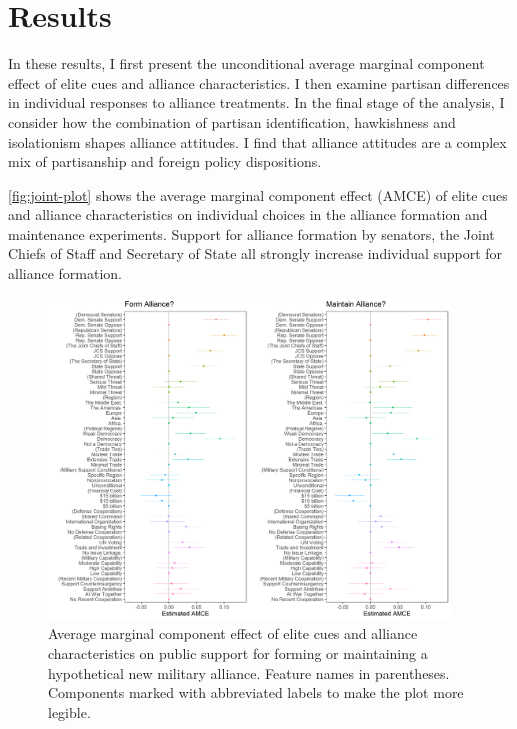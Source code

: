 \documentclass[12pt]{article}
\begin{document}
\section{Results} 


In these results, I first present the unconditional average marginal component effect of elite cues and alliance characteristics.
I then examine partisan differences in individual responses to alliance treatments. 
In the final stage of the analysis, I consider how the combination of partisan identification, hawkishness and isolationism shapes alliance attitudes. 
I find that alliance attitudes are a complex mix of partisanship and foreign policy dispositions. 


\autoref{fig:joint-plot} shows the average marginal component effect (AMCE) of elite cues and alliance characteristics on individual choices in the alliance formation and maintenance experiments.
Support for alliance formation by senators, the Joint Chiefs of Staff and Secretary of State all strongly increase individual support for alliance formation. 


\begin{figure}
	\centering
		\includegraphics[width=0.95\textwidth]{../figures/joint-amce-plots.png}
	\caption{Average marginal component effect of elite cues and alliance characteristics on public support for forming or maintaining a hypothetical new military alliance. Feature names in parentheses. Components marked with abbreviated labels to make the plot more legible.}
	\label{fig:joint-plot}
\end{figure}
\end{document}
